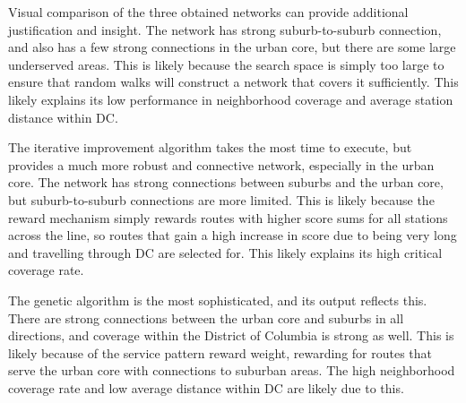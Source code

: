 \documentclass[sigconf,nonacm]{acmart}
\begin{document}
\begin{table}[h]
\caption{Sample Transit Times for Selected Origin-Destination Pairs}
\label{tab:transittimes}
\end{table}

Visual comparison of the three obtained networks can provide additional justification and insight. The network has strong suburb-to-suburb connection, and also has a few strong connections in the urban core, but there are some large underserved areas. This is likely because the search space is simply too large to ensure that random walks will construct a network that covers it sufficiently. This likely explains its low performance in neighborhood coverage and average station distance within DC.

The iterative improvement algorithm takes the most time to execute, but provides a much more robust and connective network, especially in the urban core. The network has strong connections between suburbs and the urban core, but suburb-to-suburb connections are more limited. This is likely because the reward mechanism simply rewards routes with higher score sums for all stations across the line, so routes that gain a high increase in score due to being very long and travelling through DC are selected for. This likely explains its high critical coverage rate.

The genetic algorithm is the most sophisticated, and its output reflects this. There are strong connections between the urban core and suburbs in all directions, and coverage within the District of Columbia is strong as well. This is likely because of the service pattern reward weight, rewarding for routes that serve the urban core with connections to suburban areas. The high neighborhood coverage rate and low average distance within DC are likely due to this.
\end{document}
